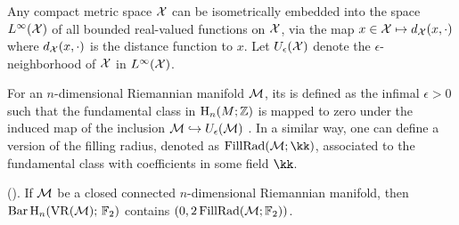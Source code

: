 \subsubsection{}\label{ss:filling_radius}

Any compact metric space $\mathcal{X}$ can be isometrically embedded into the space $L^\infty(\mathcal{X})$ of all bounded real-valued functions on $\mathcal{X}$, via the map $x \in \mathcal{X} \mapsto d_{\mathcal{X}}(x,\cdot)$ where $d_{\mathcal{X}}(x,\cdot)$ is the distance function to $x$.
Let $U_\epsilon(\mathcal{X})$ denote the $\epsilon$-neighborhood of $\mathcal{X}$ in $L^\infty(\mathcal{X})$.

For an $n$-dimensional Riemannian manifold $\mathcal{M}$, its  is defined as the infimal $\epsilon > 0$ such that the fundamental class in $\operatorname{H}_n(M;\mathbb{Z})$ is mapped to zero under the induced map of the inclusion $\mathcal{M} \hookrightarrow U_\epsilon(\mathcal{M})$ \cite[page 108]{gromov2007metric}.
In a similar way, one can define a version of the filling radius, denoted as \(\fillrad[\kk]{\cM}\), associated to the fundamental class with coefficients in some field $\kk$.

\medskip\lemma(\cite[Prop.9.4]{lim2020vietoris}). If $\mathcal{M}$ be a closed connected $n$-dimensional Riemannian manifold, then \(\operatorname{Bar} \operatorname{H}_{n}(\operatorname{VR}(\mathcal{M});\,{\mathbb{F}_2})\) contains \((0,2\operatorname{FillRad}(\mathcal{M};{\mathbb{F}_2}))\).

